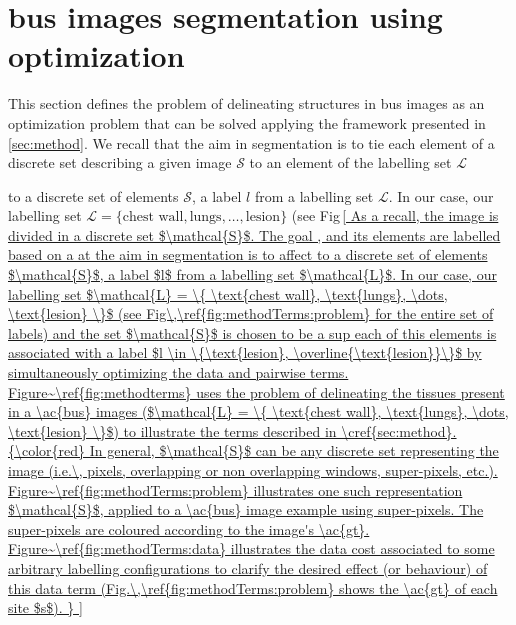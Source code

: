 \section{\ac{bus} images segmentation using optimization}\label{sec:methodApp}
This section defines the problem of delineating structures in \ac{bus} images as an optimization problem that can be solved applying the framework presented in \cref{sec:method}.
We recall that the aim in segmentation is to tie each element of a discrete set describing a given image $\mathcal{S}$ to an element of the labelling set $\mathcal{L}$

to a discrete set of elements $\mathcal{S}$, a label $l$ from a labelling set $\mathcal{L}$. In our case, our labelling set $\mathcal{L} = \{ \text{chest wall}, \text{lungs}, \dots, \text{lesion} \}$ (see Fig\,\ref{


As a recall, the image is divided in a discrete set $\mathcal{S}$. The goal 
, and its elements are labelled based on a 

at the aim in segmentation is to affect to a discrete set of elements $\mathcal{S}$, a label $l$ from a labelling set $\mathcal{L}$. In our case, our labelling set $\mathcal{L} = \{ \text{chest wall}, \text{lungs}, \dots, \text{lesion} \}$ (see Fig\,\ref{fig:methodTerms:problem} for the entire set of labels) and the set $\mathcal{S}$ is chosen to be a sup
each of this elements is associated with a label $l \in \{\text{lesion}, \overline{\text{lesion}}\}$ by simultaneously optimizing the data and pairwise terms. 

Figure~\ref{fig:methodterms} uses the problem of delineating the tissues present in a \ac{bus} images ($\mathcal{L} = \{ \text{chest wall}, \text{lungs}, \dots, \text{lesion} \}$) to illustrate the terms described in \cref{sec:method}. 

{\color{red}
In general, $\mathcal{S}$ can be any discrete set representing the image (i.e.\, pixels, overlapping or non overlapping windows, super-pixels, etc.). 
Figure~\ref{fig:methodTerms:problem} illustrates one such representation $\mathcal{S}$, applied to a \ac{bus} image example using super-pixels. The super-pixels are coloured according to the image's \ac{gt}.

Figure~\ref{fig:methodTerms:data} illustrates the data cost associated to some arbitrary labelling configurations to clarify the desired effect (or behaviour) of this data term (Fig.\,\ref{fig:methodTerms:problem} shows the \ac{gt} of each site $s$).
}

}
